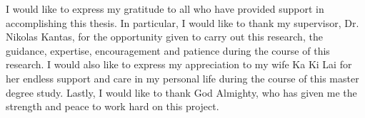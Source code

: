 

\begin{acknowledgements}      %
I would like to express my gratitude to all who have provided support in accomplishing this thesis. In particular, I would like to thank my supervisor, Dr. Nikolas Kantas, for the opportunity given to carry out this research, the guidance, expertise, encouragement and patience during the course of this research. I would also like to express my appreciation to my wife Ka Ki Lai for her endless support and care in my personal life during the course of this master degree study. Lastly, I would like to thank God Almighty, who has given me the strength and peace to work hard on this project.

\end{acknowledgements}


